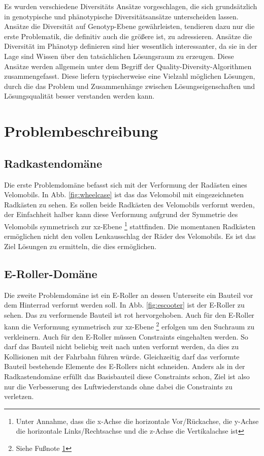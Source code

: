 \documentclass[12pt]{article}
\begin{document}
Es wurden verschiedene Diversitäts Ansätze vorgeschlagen, die sich grundsätzlich in genotypische und phänotypische Diversitätsansätze unterscheiden lassen.
Ansätze die Diversität auf Genotyp-Ebene gewährleisten, tendieren dazu nur die erste Problematik, die definitiv auch die größere ist, zu adressieren.
Ansätze die Diversität im Phänotyp definieren sind hier wesentlich interessanter, da sie in der Lage sind Wissen über den tatsächlichen Lösungsraum zu erzeugen.
Diese Ansätze werden allgemein unter dem Begriff der Quality-Diversity-Algorithmen zusammengefasst.
Diese liefern typischerweise eine Vielzahl möglichen Lösungen, durch die das Problem und Zusammenhänge zwischen Lösungseigenschaften und Lösungsqualität besser verstanden werden kann.



\section{Problembeschreibung}

\subsection{Radkastendomäne}

Die erste Problemdomäne befasst sich mit der Verformung der Radästen eines Velomobils. 
In Abb. \ref{fig:wheelcase} ist das das Velomobil mit eingezeichneten Radkästen zu sehen.
Es sollen beide Radkästen des Velomobils verformt werden, der Einfachheit halber kann diese Verformung aufgrund der Symmetrie des Velomobils symmetrisch zur xz-Ebene
\footnote{\label{foot:coords} Unter Annahme, dass die x-Achse die horizontale Vor/Rückachse, die y-Achse die horizontale Links/Rechtsachse und die z-Achse die Vertikalachse ist} stattfinden.
Die momentanen Radkästen ermöglichen nicht den vollen Lenkausschlag der Räder des Velomobils.
Es ist das Ziel Lösungen zu ermitteln, die dies ermöglichen.
                      
\subsection{E-Roller-Domäne}

Die zweite Problemdomäne ist ein E-Roller an dessen Unterseite ein Bauteil vor dem Hinterrad verformt werden soll.
In Abb. \ref{fig:escooter} ist der E-Roller zu sehen. Das zu verformende Bauteil ist rot hervorgehoben.
Auch für den E-Roller kann die Verformung symmetrisch zur xz-Ebene \footnote{Siehe Fußnote \ref{foot:coords}} erfolgen um den Suchraum zu verkleinern.
Auch für den E-Roller müssen Constraints eingehalten werden. 
So darf das Bauteil nicht beliebig weit nach unten verformt werden, da dies zu Kollisionen mit der Fahrbahn führen würde.
Gleichzeitig darf das verformte Bauteil bestehende Elemente des E-Rollers nicht schneiden.
Anders als in der Radkastendomäne erfüllt das Basisbauteil diese Constraints schon, Ziel ist also nur die Verbesserung des Luftwiederstands ohne dabei die Constraints zu verletzen.
 
\end{document}
